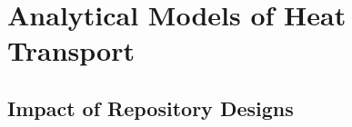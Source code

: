 











\section{Analytical Models of Heat Transport} \label{sec:analytical_heat}


\subsection{Impact of Repository Designs}

